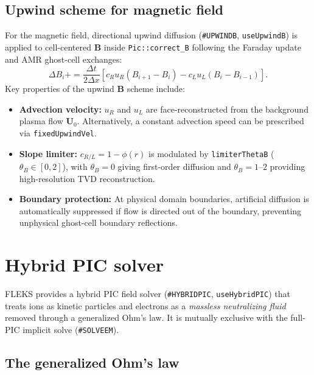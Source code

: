 \documentclass[a4paper, 11pt]{article}
\begin{document}
\subsection{Upwind scheme for magnetic field}

For the magnetic field, directional upwind diffusion (\texttt{\#UPWINDB}, \texttt{useUpwindB}) is applied to cell-centered $\mathbf{B}$ inside \texttt{Pic::correct\_B} following the Faraday update and AMR ghost-cell exchanges:
\begin{equation}
\Delta B_i += \frac{\Delta t}{2\Delta x} \left[ c_R u_R (B_{i+1} - B_i) - c_L u_L (B_i - B_{i-1}) \right].
\end{equation}
Key properties of the upwind $\mathbf{B}$ scheme include:
\begin{itemize}
  \item \textbf{Advection velocity:} $u_R$ and $u_L$ are face-reconstructed from the background plasma flow $\mathbf{U}_0$. Alternatively, a constant advection speed can be prescribed via \texttt{fixedUpwindVel}.
  \item \textbf{Slope limiter:} $c_{R/L} = 1 - \phi(r)$ is modulated by \texttt{limiterThetaB} ($\theta_B \in [0, 2]$), with $\theta_B = 0$ giving first-order diffusion and $\theta_B = 1\text{--}2$ providing high-resolution TVD reconstruction.
  \item \textbf{Boundary protection:} At physical domain boundaries, artificial diffusion is automatically suppressed if flow is directed out of the boundary, preventing unphysical ghost-cell boundary reflections.
\end{itemize}

\section{Hybrid PIC solver}

FLEKS provides a hybrid PIC field solver (\texttt{\#HYBRIDPIC}, \texttt{useHybridPIC}) that treats ions as kinetic particles and electrons as a \emph{massless neutralizing fluid} removed through a generalized Ohm's law. It is mutually exclusive with the full-PIC implicit solve (\texttt{\#SOLVEEM}).

\subsection{The generalized Ohm's law}
\end{document}

